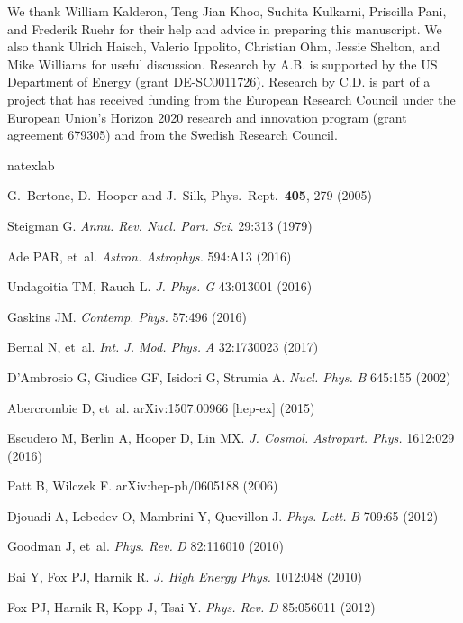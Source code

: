 \documentclass{ar-1col}
\begin{document}
We thank William Kalderon, Teng Jian Khoo, Suchita Kulkarni,
Priscilla Pani, and Frederik Ruehr for their help and advice in
preparing this manuscript. We also thank Ulrich Haisch, Valerio
Ippolito, Christian Ohm, Jessie Shelton, and Mike Williams for
useful discussion. Research by A.B. is supported by the US Department of
Energy (grant DE-SC0011726). Research by C.D. is part of a project that
has received funding from the European Research Council
under the European Union's Horizon 2020 research and innovation
program (grant agreement 679305) and from the Swedish
Research Council.


\begin{thebibliography}{175}
\expandafter\ifx\csname
natexlab\endcsname\relax\def\natexlab#1{#1}\fi

G.~Bertone, D.~Hooper and J.~Silk, Phys.\ Rept.\  {\bf 405}, 279 (2005) 

Steigman G. \textit{Annu. Rev. Nucl. Part. Sci.} 29:313 (1979)

Ade PAR, et~al. \textit{Astron. Astrophys.} 594:A13 (2016)

Undagoitia TM, Rauch L. \textit{J. Phys. G}
43:013001 (2016)

Gaskins JM. \textit{Contemp. Phys.} 57:496 (2016)

Bernal N, et~al. \textit{Int. J. Mod. Phys.} \textit{A} 32:1730023 (2017)

D'Ambrosio G, Giudice GF, Isidori G, Strumia A. \textit{Nucl.
Phys.} \textit{B} 645:155 (2002)

Abercrombie D, et~al. arXiv:1507.00966 [hep-ex] (2015)

Escudero M, Berlin A, Hooper D, Lin MX. \textit{J. Cosmol. Astropart. Phys.} 1612:029
(2016)

Patt B, Wilczek F. arXiv:hep-ph/0605188 (2006)

Djouadi A, Lebedev O, Mambrini Y, Quevillon J. \textit{Phys.
Lett.} \textit{B} 709:65 (2012)

Goodman J, et~al. \textit{Phys. Rev.} \textit{D} 82:116010 (2010)

Bai Y, Fox PJ, Harnik R. \textit{J. High Energy Phys.} 1012:048 (2010)

Fox PJ, Harnik R, Kopp J, Tsai Y. \textit{Phys. Rev.} \textit{D} 85:056011
(2012)


\end{thebibliography}
\end{document}
